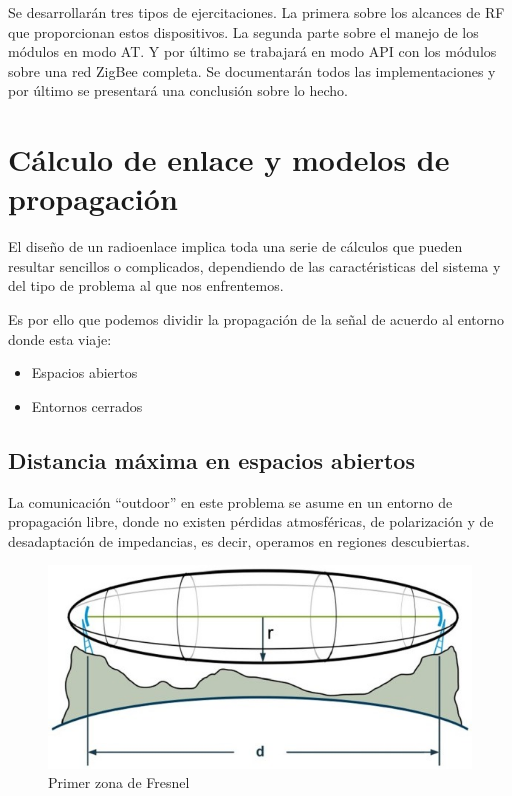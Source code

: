 \documentclass[11pt,oneside,spanish,a4paper]{article}
\begin{document}
Se desarrollarán tres tipos de ejercitaciones. La primera sobre los
alcances de RF que proporcionan estos dispositivos. La segunda parte
sobre el manejo de los módulos en modo AT. Y por último se trabajará
en modo API con los módulos sobre una red ZigBee completa. Se
documentarán todos las implementaciones y por último se presentará una
conclusión sobre lo hecho.

\section[Enlace y propagación]{C\'alculo de enlace y modelos de propagaci\'on}
\label{S:1}

El dise\~no de un radioenlace implica toda una serie de c\'alculos que pueden resultar sencillos o complicados, dependiendo de las caract\'eristicas del sistema y del tipo de problema al que nos enfrentemos.

Es por ello que podemos dividir la propagaci\'on de la se\~nal de acuerdo al entorno donde esta viaje: 

\begin{itemize}
\item Espacios abiertos 
\item Entornos cerrados
\end{itemize}


\subsection[Distancias]{Distancia m\'axima en espacios abiertos}

 La comunicaci\'on ``outdoor'' en este problema se asume en un entorno de propagaci\'on libre, donde no existen p\'erdidas atmosf\'ericas, de polarizaci\'on y de desadaptaci\'on de impedancias, es decir, operamos en regiones descubiertas. 
 
\begin{figure}[h]
	\centering\includegraphics[width=0.8\linewidth]{img/Image}
	\caption{Primer zona de Fresnel}
\end{figure}
\end{document}
